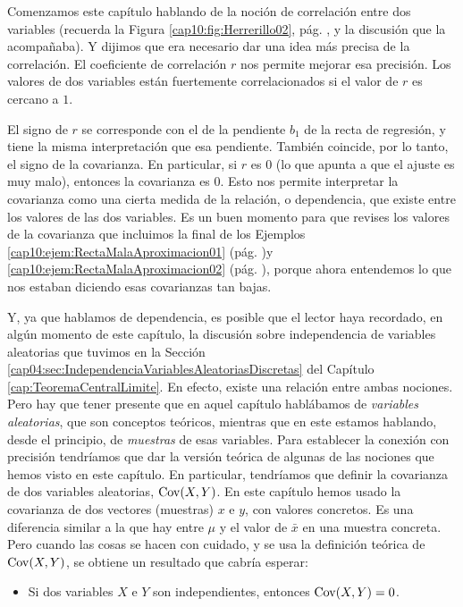 Comenzamos este capítulo hablando de la noción de correlación entre dos variables (recuerda la Figura \ref{cap10:fig:Herrerillo02}, pág. \pageref{cap10:fig:Herrerillo02}, y la discusión que la acompañaba). Y dijimos que era necesario dar una idea más precisa de la correlación. El coeficiente de correlación $r$ nos permite mejorar esa precisión. Los valores de dos variables están {\sf fuertemente correlacionados} si el valor de $r$ es cercano a $1$.

El signo de $r$ se corresponde con el de la pendiente $b_1$ de la recta de regresión, y tiene la misma interpretación que esa pendiente. También coincide, por lo tanto, el signo de la covarianza. En particular, si $r$ es $0$ (lo que apunta a que el ajuste es muy malo), entonces la covarianza es $0$. Esto nos permite interpretar la covarianza como una cierta medida de la relación, o dependencia, que existe entre los valores de las dos variables. Es un buen momento para que revises los valores de la covarianza que incluimos la final de los Ejemplos \ref{cap10:ejem:RectaMalaAproximacion01} (pág. \pageref{cap10:ejem:RectaMalaAproximacion01})y \ref{cap10:ejem:RectaMalaAproximacion02} (pág. \pageref{cap10:ejem:RectaMalaAproximacion02}), porque ahora entendemos lo que nos estaban diciendo esas covarianzas tan bajas.


Y, ya que hablamos de dependencia, es posible que el lector haya recordado, en algún momento de este capítulo, la discusión sobre independencia de variables aleatorias que tuvimos en la Sección \ref{cap04:sec:IndependenciaVariablesAleatoriasDiscretas} del Capítulo \ref{cap:TeoremaCentralLimite}. En efecto, existe una relación entre ambas nociones. Pero hay que tener presente que en aquel capítulo hablábamos de {\em variables aleatorias}, que son conceptos teóricos, mientras que en este estamos hablando, desde el principio, de {\em muestras} de esas variables. Para establecer la conexión con precisión tendríamos que dar la versión teórica de algunas de las nociones que hemos visto en este capítulo. En particular, tendríamos que definir la covarianza de dos variables aleatorias, $\mathrm{Cov}(X,Y)$. En este capítulo hemos usado la covarianza de dos vectores (muestras) $x$ e $y$, con valores concretos. Es una diferencia similar a la que hay entre $\mu$ y el valor de $\bar x$ en una muestra concreta. Pero cuando las cosas se hacen con cuidado, y se usa la definición teórica de $\mathrm{Cov}(X,Y)$, se obtiene un resultado que cabría esperar:

\begin{itemize}
 \item Si dos variables $X$ e $Y$ son independientes, entonces $\mathrm{Cov}(X,Y)=0$.
\end{itemize}

